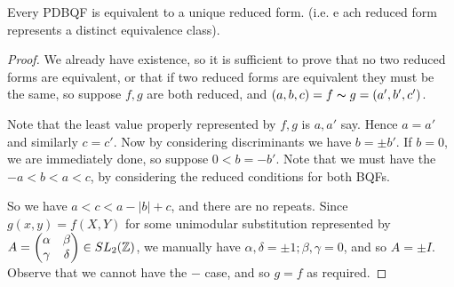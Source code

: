 \documentclass[10pt,a4paper]{article}
\begin{document}
\begin{theorem}
Every PDBQF is equivalent to a unique reduced form. (i.e. e ach reduced form represents a distinct equivalence class).
\end{theorem}
\begin{proof}
We already have existence, so it is sufficient to prove that no two reduced forms are equivalent, or that if two reduced forms are equivalent they must be the same, so suppose $f,g$ are both reduced, and $(a,b,c) = f \thicksim g = (a',b',c')$.

Note that the least value properly represented by $f, g$ is $a, a'$ say. Hence $a = a'$ and similarly $c = c'$. Now by considering discriminants we have $b = \pm b'$. If $b = 0$, we are immediately done, so suppose $0<b = -b'$. Note that we must have the $-a<b<a<c$, by considering the reduced conditions for both BQFs.

So we have $a<c<a - |b|+c$, and there are no repeats. Since $g(x,y) = f(X,Y)$ for some unimodular substitution represented by $A = \begin{pmatrix}
\alpha & \beta \\ \gamma & \delta
\end{pmatrix} \in SL_2(\mathbb{Z})$, we manually have $\alpha, \delta = \pm 1; \beta, \gamma = 0$, and so $A = \pm I$. Observe that we cannot have the $-$ case, and so $g = f$ as required.
\end{proof}
\end{document}
